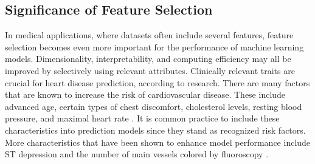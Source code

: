 \subsection{Significance of Feature Selection}
In medical applications, where datasets often include several features, feature selection becomes even more important for the performance of machine learning models. Dimensionality, interpretability, and computing efficiency may all be improved by selectively using relevant attributes. Clinically relevant traits are crucial for heart disease prediction, according to research. There are many factors that are known to increase the risk of cardiovascular disease. These include advanced age, certain types of chest discomfort, cholesterol levels, resting blood pressure, and maximal heart rate \cite{battineni2020diagnosis}. It is common practice to include these characteristics into prediction models since they stand as recognized risk factors. More characteristics that have been shown to enhance model performance include ST depression and the number of main vessels colored by fluoroscopy \cite{soman2009machine}.
